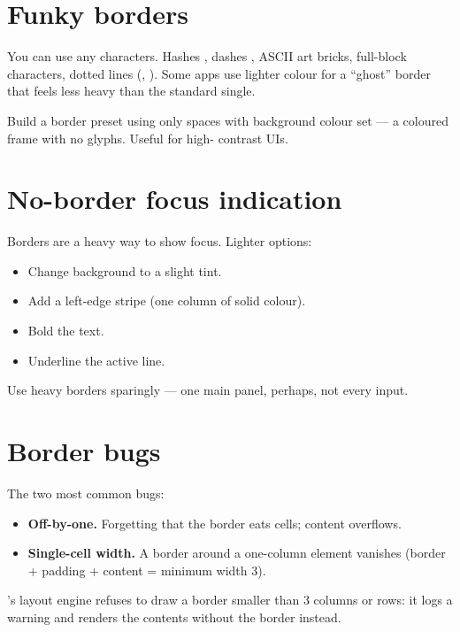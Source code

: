 \section{Funky borders}

You can use any characters. Hashes \code{\#}, dashes \code{-},
ASCII art bricks, full-block characters, dotted lines (, ). Some apps use lighter colour for a
``ghost'' border that feels less heavy than the standard
single.

\begin{tryit}
Build a border preset using only spaces with background colour
set --- a coloured frame with no glyphs. Useful for high-
contrast UIs.
\end{tryit}

\section{No-border focus indication}

Borders are a heavy way to show focus. Lighter options:

\begin{itemize}[leftmargin=*]
  \item Change background to a slight tint.
  \item Add a left-edge stripe (one column of solid colour).
  \item Bold the text.
  \item Underline the active line.
\end{itemize}

Use heavy borders sparingly --- one main panel, perhaps, not
every input.

\section{Border bugs}

The two most common bugs:

\begin{itemize}[leftmargin=*]
  \item \textbf{Off-by-one.} Forgetting that the border eats
    cells; content overflows.
  \item \textbf{Single-cell width.} A border around a
    one-column element vanishes (border + padding + content =
    minimum width 3).
\end{itemize}

\maya{}'s layout engine refuses to draw a border smaller than 3
columns or rows: it logs a warning and renders the contents
without the border instead.

